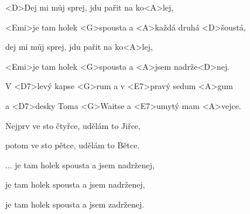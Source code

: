 

\zr
 <D>Dej mi můj sprej, jdu pařit na ko<A>lej,

 <Emi>je tam holek <G>spousta a <A>každá druhá <D>šoustá,

 dej mi můj sprej, jdu pařit na ko<A>lej,

 <Emi>je tam holek <G>spousta a <A>jsem nadrže<D>nej.
\kr

\zs
 V <D7>levý kapse <G>rum a v <E7>pravý sedum <A>gum

 a <D7>desky Toma <G>Waitse a <E7>umytý mam <A>vejce.
\ks

\zr \kr
	
\zs
Nejprv ve sto čtyřce, udělám to Jiřce,

potom ve sto pětce, udělám to Bětce.
\ks

\zr

	...	je tam holek spousta a jsem nadrženej,

	je tam holek spousta a jsem nadrženej,

	je tam holek spousta a jsem zadrženej.
\kr

\kp
